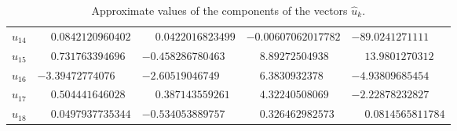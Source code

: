 \documentclass[1p]{article}
\begin{document}
\begin{table}[H]
\begin{tabular}{lllll}
        $\hat{u}_{14}$ & $\phantom{-}0.0842120960402$ & $\phantom{-}0.0422016823499$ & $-0.00607062017782$ & $-89.0241271111$ \\
        $\hat{u}_{15}$ & $\phantom{-}0.731763394696$ & $-0.458286780463$ & $\phantom{-}8.89272504938$ & $\phantom{-}13.9801270312$ \\
        $\hat{u}_{16}$ & $-3.39472774076$ & $-2.60519046749$ & $\phantom{-}6.3830932378$ & $-4.93809685454$ \\
        $\hat{u}_{17}$ & $\phantom{-}0.504441646028$ & $\phantom{-}0.387143559261$ & $\phantom{-}4.32240508069$ & $-2.22878232827$ \\
        $\hat{u}_{18}$ & $\phantom{-}0.0497937735344$ & $-0.534053889757$ & $\phantom{-}0.326462982573$ & $\phantom{-}0.0814565811784$ \\
        \hline
    \end{tabular}
    \caption{Approximate values of the components of the vectors $\hat{u}_k$.\label{table:uk}}
\end{table}
\end{document}
